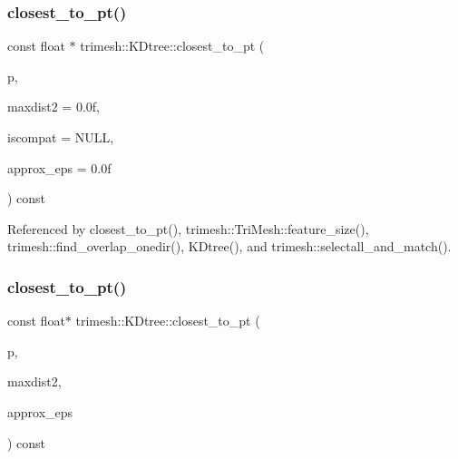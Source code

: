 \subsubsection{\texorpdfstring{closest\+\_\+to\+\_\+pt()}{closest\_to\_pt()}\hspace{0.1cm}{\footnotesize\ttfamily [1/2]}}
{\footnotesize\ttfamily const float $\ast$ trimesh\+::\+K\+Dtree\+::closest\+\_\+to\+\_\+pt (\begin{DoxyParamCaption}\item[{const float $\ast$}]{p,  }\item[{float}]{maxdist2 = {\ttfamily 0.0f},  }\item[{const \hyperlink{structtrimesh_1_1KDtree_1_1CompatFunc}{Compat\+Func} $\ast$}]{iscompat = {\ttfamily NULL},  }\item[{float}]{approx\+\_\+eps = {\ttfamily 0.0f} }\end{DoxyParamCaption}) const}



Referenced by closest\+\_\+to\+\_\+pt(), trimesh\+::\+Tri\+Mesh\+::feature\+\_\+size(), trimesh\+::find\+\_\+overlap\+\_\+onedir(), K\+Dtree(), and trimesh\+::selectall\+\_\+and\+\_\+match().

\mbox{\label{classtrimesh_1_1KDtree_a90066965f638191f3bb2edab8d70ab3a}} 
\subsubsection{\texorpdfstring{closest\+\_\+to\+\_\+pt()}{closest\_to\_pt()}\hspace{0.1cm}{\footnotesize\ttfamily [2/2]}}
{\footnotesize\ttfamily const float$\ast$ trimesh\+::\+K\+Dtree\+::closest\+\_\+to\+\_\+pt (\begin{DoxyParamCaption}\item[{const float $\ast$}]{p,  }\item[{float}]{maxdist2,  }\item[{float}]{approx\+\_\+eps }\end{DoxyParamCaption}) const\hspace{0.3cm}{\ttfamily [inline]}}

\mbox{\label{classtrimesh_1_1KDtree_a3e3cc3eff36b04c01c065fcee1364922}} 

